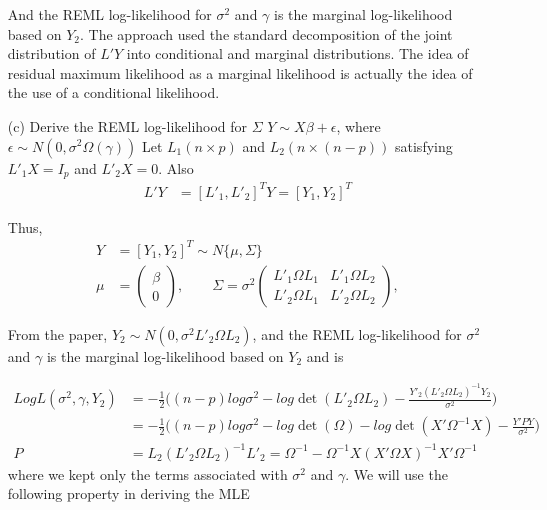 \begin{itemize}
And the REML log-likelihood for $\sigma^2$ and $\gamma$ is the marginal log-likelihood based on $Y_2$. The approach used the standard decomposition of the joint distribution of $L' Y$ into conditional and marginal distributions. The idea of residual maximum likelihood as a marginal likelihood is actually the idea of the use of a conditional likelihood.

\item[(c)] Derive the REML log-likelihood for $\Sigma$ 
$Y \sim X \beta + \epsilon$, where $\epsilon \sim N(0, \sigma^2 \Omega(\gamma))$
Let $L_1(n \times p)$ and $L_2(n \times (n-p))$ satisfying $L'_1 X = I_p$ and $L'_2 X = 0$. Also
 \begin{align*}
    L' Y&= [L'_1, L'_2]^T Y = [Y_1, Y_2]^T
\end{align*}

Thus, 
 \begin{align*}
    Y &= [Y_1, Y_2]^T \sim N \{ \mu, \Sigma \} \\
    \mu &= \begin{pmatrix}
     \beta \\
     0
    \end{pmatrix}, \qquad \Sigma = \sigma^2 \begin{pmatrix}
     L'_1 \Omega L_1 &  L'_1 \Omega L_2 \\
     L'_2 \Omega L_1 & L'_2 \Omega L_2
    \end{pmatrix},
\end{align*}

From the paper, $Y_2 \sim N(0, \sigma^2 L'_2 \Omega L_2) $, and the REML log-likelihood for $\sigma^2$ and $\gamma$ is the marginal log-likelihood based on $Y_2$ and is 

 \begin{align*}
    Log L(\sigma^2, \gamma, Y_2) &= -\frac{1}{2} \Big( (n-p) log \sigma^2 - log \det (L'_2 \Omega L_2) - \frac{Y'_2 (L'_2 \Omega L_2)^{-1} Y_2}{\sigma^2} \Big) \\
        &=  -\frac{1}{2} \Big( (n-p) log \sigma^2 - log \det ( \Omega ) - log \det (X' \Omega^{-1} X) - \frac{Y' P Y}{\sigma^2} \Big) \\
    P &= L_2 (L'_2 \Omega L_2)^{-1} L'_2 = \Omega^{-1} - \Omega^{-1} X (X' \Omega X)^{-1} X' \Omega^{-1} 
\end{align*}
where we kept only the terms associated with $\sigma^2$ and $\gamma$. We will use the following property in deriving the MLE


\end{itemize}

